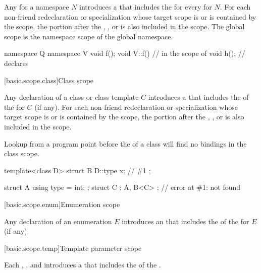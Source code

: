 \pnum
Any  for a namespace $N$ introduces
a 
that includes the 
for every  for $N$.
For each non-friend redeclaration or specialization
whose target scope is or is contained by the scope,
the portion after the
,
, or
is also included in the scope.
The global scope is
the namespace scope of the global namespace.
\begin{example}
\begin{codeblock}
namespace Q {
  namespace V { void f(); }
  void V::f() {         // in the scope of 
    void h();           // declares 
  }
}
\end{codeblock}
\end{example}

[basic.scope.class]{Class scope}

\pnum
Any declaration of a class or class template $C$ introduces
a 
that includes the  of
the  for $C$ (if any).
For each non-friend redeclaration or specialization
whose target scope is or is contained by the scope,
the portion after the
,
, or
 is also included in the scope.
\begin{note}
Lookup from a program point
before the  of a class
will find no bindings in the class scope.
\begin{example}
\begin{codeblock}
template<class D>
struct B {
  D::type x;            // \#1
};

struct A { using type = int; };
struct C : A, B<C> {};  // error at \#1:  not found
\end{codeblock}
\end{example}
\end{note}

[basic.scope.enum]{Enumeration scope}%

\pnum
Any declaration of an enumeration $E$ introduces
an 
that includes the  of
the  for $E$ (if any).

[basic.scope.temp]{Template parameter scope}%

\pnum
Each
,
, and
introduces
a 
that includes the  of
the .

